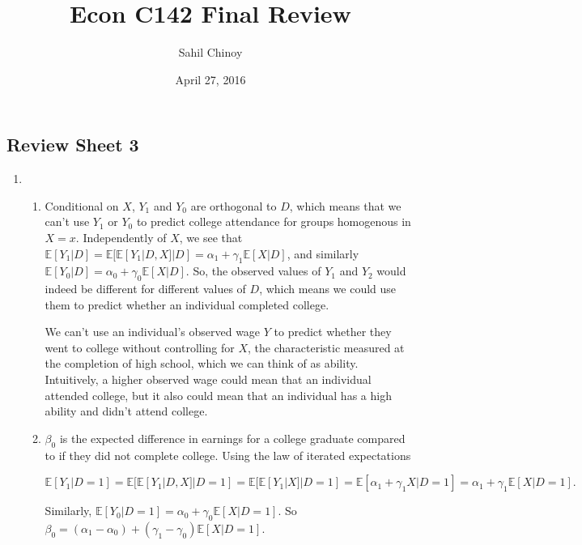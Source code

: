 \documentclass{article}
\title{Econ C142 Final Review}
\author{Sahil Chinoy}
\date{April 27, 2016}
\begin{document}
\maketitle{}

\subsection*{Review Sheet 3}

\begin{enumerate}

	\item

	\begin{enumerate}

		\item

		Conditional on $X$, $Y_1$ and $Y_0$ are orthogonal to $D$, which means that we can't use $Y_1$ or $Y_0$ to predict college attendance for groups homogenous in $X = x$. Independently of $X$, we see that $\mathbb{E}[Y_1|D] = \mathbb{E}[\mathbb{E}[Y_1|D,X]|D] = \alpha_1 + \gamma_1\mathbb{E}[X|D]$, and similarly $\mathbb{E}[Y_0|D] = \alpha_0 + \gamma_0\mathbb{E}[X|D]$. So, the observed values of $Y_1$ and $Y_2$ would indeed be different for different values of $D$, which means we could use them to predict whether an individual completed college.

		We can't use an individual's observed wage $Y$ to predict whether they went to college without controlling for $X$, the characteristic measured at the completion of high school, which we can think of as ability. Intuitively, a higher observed wage could mean that an individual attended college, but it also could mean that an individual has a high ability and didn't attend college.

		\item

		$\beta_0$ is the expected difference in earnings for a college graduate compared to if they did not complete college. Using the law of iterated expectations

		\begin{equation*}
		\mathbb{E}[Y_1|D=1] = \mathbb{E}[\mathbb{E}[Y_1|D,X]|D=1] = \mathbb{E}[\mathbb{E}[Y_1|X]|D=1] = \mathbb{E}[\alpha_1 + \gamma_1 X|D=1] = \alpha_1 + \gamma_1 \mathbb{E}[X|D=1].
		\end{equation*}

		Similarly, $\mathbb{E}[Y_0|D=1] = \alpha_0 + \gamma_0 \mathbb{E}[X|D=1]$. So $\beta_0 = (\alpha_1 - \alpha_0) + (\gamma_1 - \gamma_0) \mathbb{E}[X|D=1]$.


\end{enumerate}
\end{enumerate}
\end{document}
